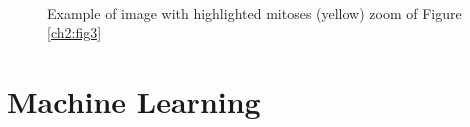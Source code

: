 \begin{figure}[!hpbt]
 \centering
  \\
  \caption[Zoom of Figure \ref{ch2:fig3}]{Example of image with highlighted mitoses (yellow) zoom of Figure \ref{ch2:fig3} }
  \label{ch2:fig3b}
\end{figure}

\clearpage

\section{Machine Learning}
\label{ch2:ML}

